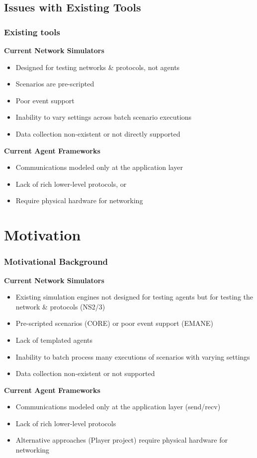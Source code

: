 \documentclass[mathserif,usenames,dvipsnames]{beamer}
\begin{document}
\subsection{Issues with Existing Tools}
\frame
{
    \frametitle{Existing tools}
    \textbf{Current Network Simulators}
    \begin{itemize}
        \item Designed for testing networks \& protocols, not agents 
        \item Scenarios are pre-scripted
        \item Poor event support
        \item Inability to vary settings across batch scenario executions
        \item Data collection non-existent or not directly supported
    \end{itemize}
    \textbf{Current Agent Frameworks}
    \begin{itemize}
        \item Communications modeled only at the application layer
        \item Lack of rich lower-level protocols, or
        \item Require physical hardware for networking
    \end{itemize}
}

\section{Motivation}
\frame
{
    \frametitle{Motivational Background}
    \textbf{Current Network Simulators}
    \begin{itemize}
	\item Existing simulation engines not designed for testing agents but for testing the network \& protocols (NS2/3)
	\item Pre-scripted scenarios (CORE) or poor event support (EMANE)
	\item Lack of templated agents
	\item Inability to batch process many executions of scenarios with varying settings
	\item Data collection non-existent or not supported
    \end{itemize}
    \textbf{Current Agent Frameworks}
    \begin{itemize}
	\item Communications modeled only at the application layer (send/recv)
	\item Lack of rich lower-level protocols
	\item Alternative approaches (Player project) require physical hardware for networking
    \end{itemize}
}
\end{document}
